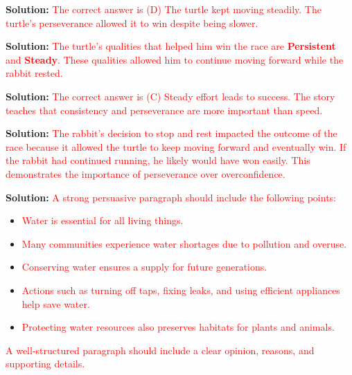 \documentclass[12pt]{article}
\begin{document}
\begin{tcolorbox}[colframe=black!50, colback=white, title=Question 6]
\textbf{Solution:} \textcolor{red}{The correct answer is (D) The turtle kept moving steadily. The turtle's perseverance allowed it to win despite being slower.}
\end{tcolorbox}

\begin{tcolorbox}[colframe=black!50, colback=white, title=Question 7]
\textbf{Solution:} \textcolor{red}{The turtle’s qualities that helped him win the race are \textbf{Persistent} and \textbf{Steady}. These qualities allowed him to continue moving forward while the rabbit rested.}
\end{tcolorbox}

\begin{tcolorbox}[colframe=black!50, colback=white, title=Question 8]
\textbf{Solution:} \textcolor{red}{The correct answer is (C) Steady effort leads to success. The story teaches that consistency and perseverance are more important than speed.}
\end{tcolorbox}

\begin{tcolorbox}[colframe=black!50, colback=white, title=Question 9]
\textbf{Solution:} \textcolor{red}{The rabbit's decision to stop and rest impacted the outcome of the race because it allowed the turtle to keep moving forward and eventually win. If the rabbit had continued running, he likely would have won easily. This demonstrates the importance of perseverance over overconfidence.}
\end{tcolorbox}

\begin{tcolorbox}[colframe=black!50, colback=white, title=Question 10: Writing Performance Task (3.W.1)]
\textbf{Solution:} \textcolor{red}{A strong persuasive paragraph should include the following points:}
\begin{itemize}
    \item \textcolor{red}{Water is essential for all living things.}
    \item \textcolor{red}{Many communities experience water shortages due to pollution and overuse.}
    \item \textcolor{red}{Conserving water ensures a supply for future generations.}
    \item \textcolor{red}{Actions such as turning off taps, fixing leaks, and using efficient appliances help save water.}
    \item \textcolor{red}{Protecting water resources also preserves habitats for plants and animals.}
\end{itemize}
\textcolor{red}{A well-structured paragraph should include a clear opinion, reasons, and supporting details.}
\end{tcolorbox}
\end{document}
